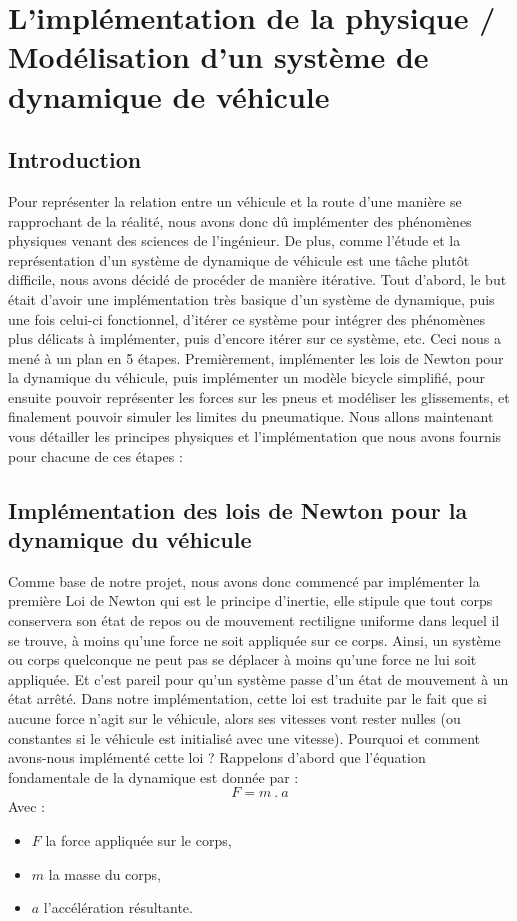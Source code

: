 \section{L'implémentation de la physique / Modélisation d'un système de dynamique de véhicule}\label{sec:l'implementation-de-la-physique-/-modelisation-d'un-systeme-de-dynamique-de-vehicule}
\subsection{Introduction}\label{subsec:introduction}
Pour représenter la relation entre un véhicule et la route d'une manière se rapprochant de la réalité, nous avons donc dû implémenter des phénomènes physiques venant des sciences de l'ingénieur. De plus, comme l'étude et la représentation d'un système  de dynamique de véhicule est une tâche plutôt difficile, nous avons décidé de procéder de manière itérative. Tout d'abord, le but était d'avoir une implémentation très basique d'un système de dynamique,  puis une fois celui-ci fonctionnel, d'itérer ce système pour intégrer des phénomènes plus délicats à implémenter, puis d'encore itérer sur ce système, etc.
Ceci nous a mené à un plan en 5 étapes.
Premièrement, implémenter les lois de Newton pour la dynamique du véhicule, puis implémenter un modèle bicycle simplifié, pour ensuite pouvoir représenter les forces sur les pneus et modéliser les glissements, et finalement pouvoir simuler les limites du pneumatique.
Nous allons maintenant vous détailler les principes physiques et l'implémentation que nous avons fournis pour chacune de ces étapes :

\subsection{Implémentation des lois de Newton pour la dynamique du véhicule}\label{subsec:implementation-des-lois-de-newton-pour-la-dynamique-du-vehicule}

Comme base de notre projet, nous avons donc commencé par implémenter la première Loi de Newton qui est le principe d'inertie, elle stipule que tout corps conservera son état de repos ou de mouvement rectiligne uniforme dans lequel il se trouve, à moins qu'une force ne soit appliquée sur ce corps. Ainsi, un système ou corps quelconque ne peut pas se déplacer à moins qu'une force ne lui soit appliquée. Et c'est pareil pour qu'un système passe d'un état de mouvement à un état arrêté.
Dans notre implémentation, cette loi est traduite par le fait que si aucune force n'agit sur le véhicule, alors ses vitesses vont rester nulles (ou constantes si le véhicule est initialisé avec une vitesse).
Pourquoi et comment avons-nous implémenté cette loi ?
Rappelons d'abord que l'équation fondamentale de la dynamique est donnée par :
$$F = m \ .\  a$$
Avec :
\begin{itemize}
    \item $F$ la force appliquée sur le corps,
    \item $m$ la masse du corps,
    \item $a$ l'accélération résultante.
\end{itemize}

